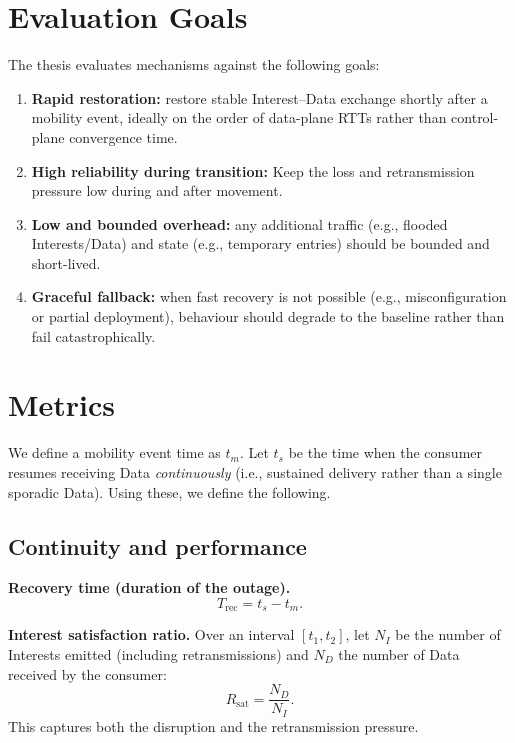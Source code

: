 \section{Evaluation Goals}
\label{sec:problem:evaluation_goals}

The thesis evaluates mechanisms against the following goals:

\begin{enumerate}
  \item \textbf{Rapid restoration:} restore stable Interest--Data exchange shortly after a mobility event, ideally on the order of data-plane RTTs rather than control-plane convergence time.
  \item \textbf{High reliability during transition:} Keep the loss and retransmission pressure low during and after movement.
  \item \textbf{Low and bounded overhead:} any additional traffic (e.g., flooded Interests/Data) and state (e.g., temporary entries) should be bounded and short-lived.
  \item \textbf{Graceful fallback:} when fast recovery is not possible (e.g., misconfiguration or partial deployment), behaviour should degrade to the baseline rather than fail catastrophically.
\end{enumerate}


\section{Metrics}
\label{sec:problem:metrics}

We define a mobility event time as $t_m$. Let $t_s$ be the time when the consumer resumes receiving Data \emph{continuously} (i.e., sustained delivery rather than a single sporadic Data). Using these, we define the following.

\subsection{Continuity and performance}
\label{sec:problem:metrics:continuity_and_performance}

\textbf{Recovery time (duration of the outage).}
\begin{equation}
  T_{\mathrm{rec}} = t_s - t_m.
\end{equation}

\textbf{Interest satisfaction ratio.}
Over an interval $[t_1,t_2]$, let $N_I$ be the number of Interests emitted (including retransmissions) and $N_D$ the number of Data received by the consumer:
\begin{equation}
  R_{\mathrm{sat}} = \frac{N_D}{N_I}.
\end{equation}
This captures both the disruption and the retransmission pressure.


